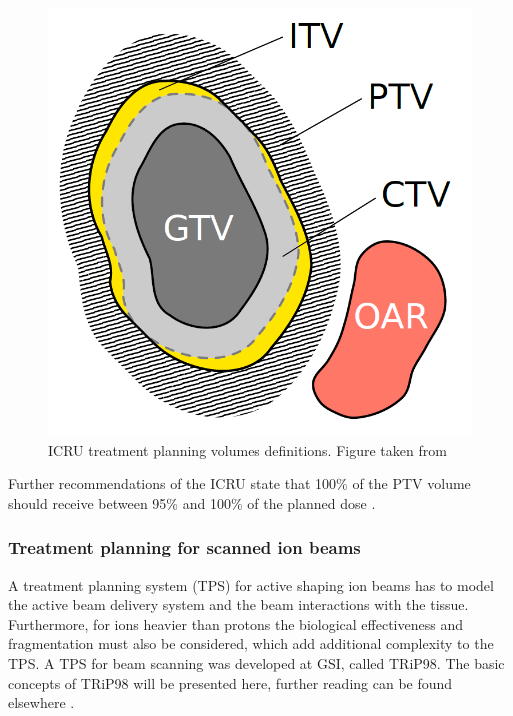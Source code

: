 \documentclass[type=dr, dr=rernat, accentcolor=tud7b,colorbacktitle, bigchapter, openright, twoside, 12pt ]{tudthesis}
\begin{document}
\begin{figure}[H]
\begin{center}
\includegraphics[scale=0.3]{./Images/volumes.png}
\caption{ICRU treatment planning volumes definitions. Figure taken from \cite{Richter2012}}
\label{targets}
\end{center}
\end{figure}

Further recommendations of the ICRU state that 100\% of the PTV volume should receive between 95\% and 100\% of the planned dose \cite{ICRU50}.


\subsubsection{Treatment planning for scanned ion beams}

A treatment planning system (TPS) for active shaping ion beams has to model the active beam delivery system and the beam interactions with the tissue. Furthermore, for ions heavier than protons
the biological effectiveness and fragmentation must also be considered, which add additional complexity to the TPS. A TPS for beam scanning was developed at GSI, called TRiP98. The basic concepts of TRiP98 will be
presented here, further reading can be found elsewhere \cite{Kraemer2000,Kraemer2000a, Richter2013}.
\end{document}
